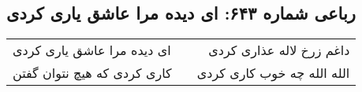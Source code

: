 \begin{center}
\section*{رباعی شماره ۶۴۳: ای دیده مرا عاشق یاری کردی}
\label{sec:sh643}
\begin{longtable}{l p{0.5cm} r}
ای دیده مرا عاشق یاری کردی
&&
داغم زرخ لاله عذاری کردی
\\
کاری کردی که هیچ نتوان گفتن
&&
الله الله چه خوب کاری کردی
\\
\end{longtable}
\end{center}
